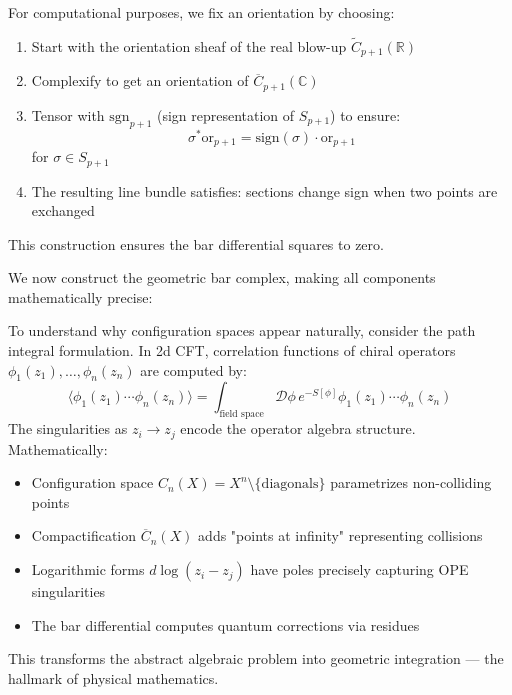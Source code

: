 \begin{remark}
For computational purposes, we fix an orientation by choosing:
\begin{enumerate}
\item Start with the orientation sheaf of the real blow-up $\widetilde{C}_{p+1}(\mathbb{R})$
\item Complexify to get an orientation of $\overline{C}_{p+1}(\mathbb{C})$ 
\item Tensor with $\text{sgn}_{p+1}$ (sign representation of $S_{p+1}$) to ensure:
   $$\sigma^* \text{or}_{p+1} = \text{sign}(\sigma) \cdot \text{or}_{p+1}$$
   for $\sigma \in S_{p+1}$
\item The resulting line bundle satisfies: sections change sign when two points are exchanged
\end{enumerate}
This construction ensures the bar differential squares to zero.
\end{remark}

We now construct the geometric bar complex, making all components mathematically precise:
 
\begin{remark}
To understand why configuration spaces appear naturally, consider the path integral formulation. In 2d CFT, correlation functions of chiral operators $\phi_1(z_1), \ldots, \phi_n(z_n)$ are computed by:
\[
\langle \phi_1(z_1) \cdots \phi_n(z_n) \rangle = \int_{\text{field space}} \mathcal{D}\phi \, e^{-S[\phi]} \phi_1(z_1) \cdots \phi_n(z_n)
\]
The singularities as $z_i \to z_j$ encode the operator algebra structure. Mathematically:
\begin{itemize}
\item Configuration space $C_n(X) = X^n \setminus \{\text{diagonals}\}$ parametrizes non-colliding points
\item Compactification $\overline{C}_n(X)$ adds "points at infinity" representing collisions
\item Logarithmic forms $d\log(z_i - z_j)$ have poles precisely capturing OPE singularities
\item The bar differential computes quantum corrections via residues
\end{itemize}
This transforms the abstract algebraic problem into geometric integration --- the hallmark of physical mathematics.
\end{remark}

